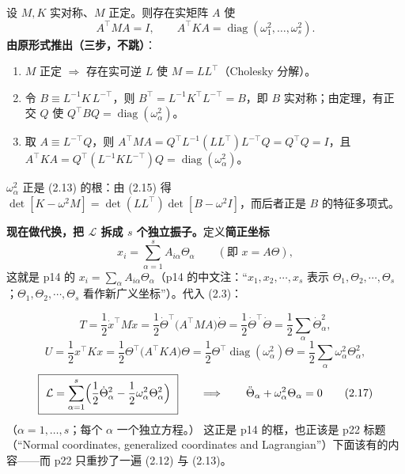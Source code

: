 \documentclass[11pt]{ctexart}
\begin{document}
设 $M,K$ 实对称、$M$ 正定。则存在实矩阵 $A$ 使
\[
A^{\!\top}MA=I,\qquad A^{\!\top}KA=\operatorname{diag}(\omega_1^2,\dots,\omega_s^2).
\tag{2.15}
\]
\textbf{由原形式推出（三步，不跳）}：
\begin{enumerate}
\item $M$ 正定 $\Rightarrow$ 存在实可逆 $L$ 使 $M=LL^{\!\top}$（Cholesky 分解）。
\item 令 $B\equiv L^{-1}K\,L^{-\!\top}$，则 $B^{\!\top}=L^{-1}K^{\!\top}L^{-\!\top}=B$，即 $B$ 实对称；由定理，有正交 $Q$ 使 $Q^{\!\top}BQ=\operatorname{diag}(\omega_\alpha^2)$。
\item 取 $A\equiv L^{-\!\top}Q$，则 $A^{\!\top}MA=Q^{\!\top}L^{-1}(LL^{\!\top})L^{-\!\top}Q=Q^{\!\top}Q=I$，且 $A^{\!\top}KA=Q^{\!\top}(L^{-1}KL^{-\!\top})Q=\operatorname{diag}(\omega_\alpha^2)$。
\end{enumerate}
$\omega_\alpha^2$ 正是 (2.13) 的根：由 (2.15) 得 $\det[K-\omega^2M]=\det(LL^{\!\top})\det[B-\omega^2I]$，而后者正是 $B$ 的特征多项式。


\textbf{现在做代换，把 $\mathcal{L}$ 拆成 $s$ 个独立振子。}定义\textbf{简正坐标}
\[
x_i=\sum_{\alpha=1}^{s}A_{i\alpha}\Theta_\alpha\qquad(\text{即 } x=A\Theta),
\tag{2.16}
\]
这就是 p14 的 $x_i=\sum_\alpha A_{i\alpha}\Theta_\alpha$（p14 的中文注：“$x_1,x_2,\cdots,x_s$ 表示 $\Theta_1,\Theta_2,\cdots,\Theta_s$；$\Theta_1,\Theta_2,\cdots,\Theta_s$ 看作新广义坐标”）。代入 (2.3)：

\[
T=\frac12\dot x^{\!\top}M\dot x=\frac12\dot\Theta^{\!\top}\bigl(A^{\!\top}MA\bigr)\dot\Theta=\frac12\dot\Theta^{\!\top}\dot\Theta=\frac12\sum_\alpha\dot\Theta_\alpha^2 ,
\]
\[
U=\frac12x^{\!\top}Kx=\frac12\Theta^{\!\top}\bigl(A^{\!\top}KA\bigr)\Theta=\frac12\Theta^{\!\top}\operatorname{diag}(\omega_\alpha^2)\Theta=\frac12\sum_\alpha\omega_\alpha^2\Theta_\alpha^2 ,
\]
\[
\boxed{\ \mathcal{L}=\sum_{\alpha=1}^{s}\Bigl(\frac12\dot\Theta_\alpha^2-\frac12\omega_\alpha^2\Theta_\alpha^2\Bigr)\ }
\qquad\Longrightarrow\qquad
\ddot\Theta_\alpha+\omega_\alpha^2\Theta_\alpha=0
\tag{2.17}
\]
（$\alpha=1,\dots,s$；每个 $\alpha$ 一个独立方程。）
这正是 p14 的框，也正该是 p22 标题（“Normal coordinates, generalized coordinates and Lagrangian”）下面该有的内容——而 p22 只重抄了一遍 (2.12) 与 (2.13)。
\end{document}
